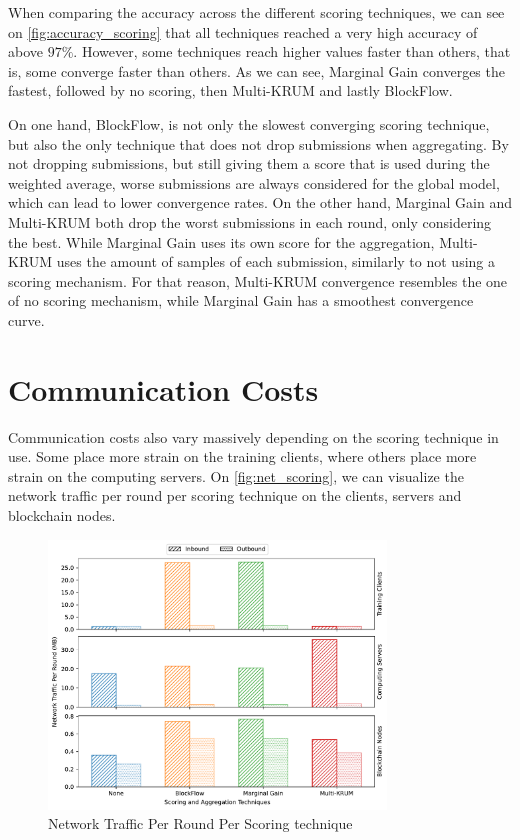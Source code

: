 When comparing the accuracy across the different scoring techniques, we can see on \autoref{fig:accuracy_scoring} that all techniques reached a very high accuracy of above $97\%$. However, some techniques reach higher values faster than others, that is, some converge faster than others. As we can see, Marginal Gain converges the fastest, followed by no scoring, then Multi-KRUM and lastly BlockFlow.

On one hand, BlockFlow, is not only the slowest converging scoring technique, but also the only technique that does not drop submissions when aggregating. By not dropping submissions, but still giving them a score that is used during the weighted average, worse submissions are always considered for the global model, which can lead to lower convergence rates. 
On the other hand, Marginal Gain and Multi-KRUM both drop the worst submissions in each round, only considering the best. While Marginal Gain uses its own score for the aggregation, Multi-KRUM uses the amount of samples of each submission, similarly to not using a scoring mechanism. For that reason, Multi-KRUM convergence resembles the one of no scoring mechanism, while Marginal Gain has a smoothest convergence curve.

\section{Communication Costs}

Communication costs also vary massively depending on the scoring technique in use. Some place more strain on the training clients, where others place more strain on the computing servers. On \autoref{fig:net_scoring}, we can visualize the network traffic per round per scoring technique on the clients, servers and blockchain nodes.

\begin{figure}[!ht]
    \centering
    \centering
    \includegraphics[width=0.8\textwidth]{graphics/04_scoring_net.pdf}
    \caption{Network Traffic Per Round Per Scoring technique}
    \label{fig:net_scoring}
\end{figure}

